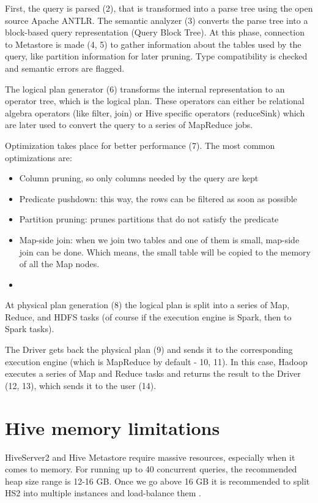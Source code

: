 First, the query is parsed (2), that is transformed into a parse tree using the open source Apache ANTLR.  The semantic analyzer (3) converts the parse tree into a block-based query representation (Query Block Tree). At this phase, connection to Metastore is made (4, 5) to gather information about the tables used by the query, like partition information for later pruning. Type compatibility is checked and semantic errors are flagged.

The logical plan generator (6) transforms the internal representation to an operator tree, which is the logical plan. These operators can either be relational algebra operators (like filter, join) or Hive specific operators (\eg reduceSink) which are later used to convert the query to a series of MapReduce jobs.

Optimization takes place for better performance (7). The most common optimizations are: 
\begin{itemize}
	\item Column pruning, so only columns needed by the query are kept
	\item Predicate pushdown: this way, the rows can be filtered as soon as possible
	\item Partition pruning: prunes partitions that do not satisfy the predicate
	\item Map-side join: when we join two tables and one of them is small, map-side join can be done. Which means, the small table will be copied to the memory of all the Map nodes.
	\item \etc
\end{itemize}

At physical plan generation (8) the logical plan is split into a series of Map, Reduce, and HDFS tasks (of course if the execution engine is Spark, then to Spark tasks). 

The Driver gets back the physical plan (9) and sends it to the corresponding execution engine (which is MapReduce by default - 10, 11). In this case, Hadoop executes a series of Map and Reduce tasks and returns the result to the Driver (12, 13), which sends it to the user (14).

\section{Hive memory limitations}
HiveServer2 and Hive Metastore require massive resources, especially when it comes to memory. For running up to 40 concurrent queries, the recommended heap size range is 12-16 GB. Once we go above 16 GB it is recommended to split HS2 into multiple instances and load-balance them \cite{Hive-memory-problems}.

